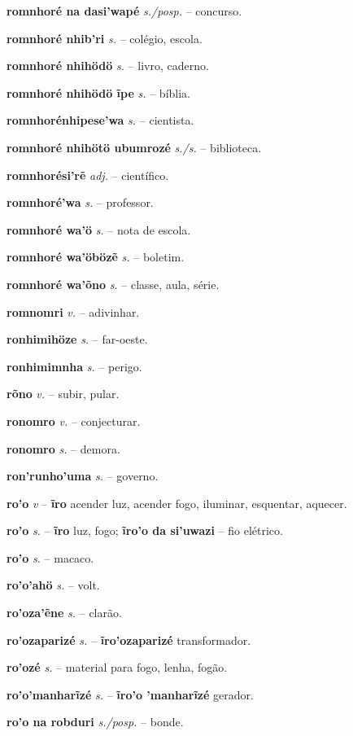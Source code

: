 \textbf{romnhoré na dasi'wapé} \textit{s./posp.} -- concurso.

\textbf{romnhoré nhib'ri} \textit{s.} -- colégio, escola.

\textbf{romnhoré nhihödö} \textit{s.} -- livro, caderno.

\textbf{romnhoré nhihödö ĩpe} \textit{s.} -- bíblia.

\textbf{romnhorénhipese'wa} \textit{s.} -- cientista.

\textbf{romnhoré nhihötö ubumrozé} \textit{s./s.} -- biblioteca.

\textbf{romnhorési'rẽ} \textit{adj.} -- científico.

\textbf{romnhoré'wa} \textit{s.} -- professor.

\textbf{romnhoré wa'ö} \textit{s.} -- nota de escola.

\textbf{romnhoré wa'öbözẽ} \textit{s.} -- boletim.

\textbf{romnhoré wa'õno} \textit{s.} -- classe, aula, série.

\textbf{romnomri} \textit{v.} -- adivinhar.

\textbf{ronhimihöze} \textit{s.} -- far-oeste.

\textbf{ronhimimnha} \textit{s.} -- perigo.

\textbf{rõno} \textit{v.} -- subir, pular.

\textbf{ronomro} \textit{v.} -- conjecturar.

\textbf{ronomro} \textit{s.} -- demora.

\textbf{ron'runho'uma} \textit{s.} -- governo.

\textbf{ro'o} \textit{v} -- \textbf{ĩro} acender luz, acender fogo, iluminar, esquentar, aquecer.

\textbf{ro'o} \textit{s.} -- \textbf{ĩro} luz, fogo; \textbf{ĩro'o da si'uwazi} -- fio elétrico.

\textbf{ro'o} \textit{s.} -- macaco.

\textbf{ro'o'ahö} \textit{s.} -- volt.

\textbf{ro'oza'ẽne} \textit{s.} -- clarão.

\textbf{ro'ozaparizé} \textit{s.} -- \textbf{ĩro'ozaparizé} transformador.

\textbf{ro'ozé} \textit{s.} -- material para fogo, lenha, fogão.

\textbf{ro'o'manharĩzé} \textit{s.} -- \textbf{ĩro'o 'manharĩzé} gerador.

\textbf{ro'o na robduri} \textit{s./posp.} -- bonde.


